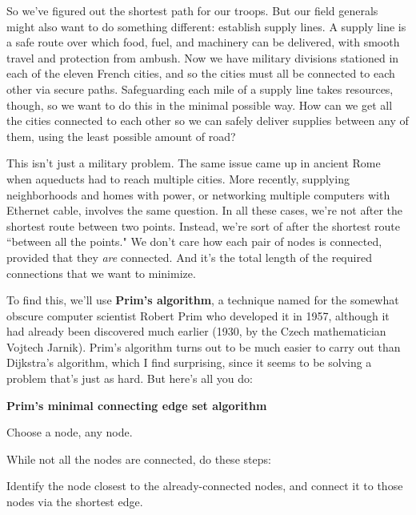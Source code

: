 So we've figured out the shortest path for our troops. But our field
generals might also want to do something different: establish supply lines.
A supply line is a safe route over which food, fuel, and machinery can be
delivered, with smooth travel and protection from ambush. Now we have
military divisions stationed in each of the eleven French cities, and so
the cities must all be connected to each other via secure paths.
Safeguarding each mile of a supply line takes resources, though, so we want
to do this in the minimal possible way. How can we get all the cities
connected to each other so we can safely deliver supplies between any of
them, using the least possible amount of road?

This isn't just a military problem. The same issue came up in ancient Rome
when aqueducts had to reach multiple cities. More recently, supplying
neighborhoods and homes with power, or networking multiple computers with
Ethernet cable, involves the same question. In all these cases, we're not
after the shortest route between two points. Instead, we're sort of after
the shortest route ``between all the points." We don't care how each pair
of nodes is connected, provided that they \textit{are} connected. And it's
the total length of the required connections that we want to minimize.

To find this, we'll use \textbf{Prim's algorithm}, a technique named for
the somewhat obscure computer scientist Robert Prim who developed it in
1957, although it had already been discovered much earlier (1930, by the
Czech mathematician Vojtech Jarnik). Prim's algorithm turns out to be much
easier to carry out than Dijkstra's algorithm, which I find surprising,
since it seems to be solving a problem that's just as hard. But here's all
you do:

\vspace{.1in}
\begin{samepage}
\begin{framed}
\textbf{Prim's minimal connecting edge set algorithm}
\begin{compactenum}
\item Choose a node, any node.
\item While not all the nodes are connected, do these steps:
    \begin{compactenum}
    \item \label{greedystep} Identify the node closest to the 
already-connected nodes, and connect it to those nodes via the shortest
edge.
    \end{compactenum}
\end{compactenum}
\end{framed}
\end{samepage}

